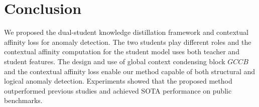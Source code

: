 \documentclass[10pt,twocolumn,letterpaper]{article}
\begin{document}
\section{Conclusion}
We proposed the dual-student knowledge distillation framework and contextual affinity loss for anomaly detection. The two students play different roles and the contextual affinity computation for the student model uses both teacher and student features. The design and use of global context condensing block $GCCB$ and the contextual affinity loss enable our method capable of both structural and logical anomaly detection. Experiments showed that the proposed method outperformed previous studies and achieved SOTA performance on public benchmarks.


{\small


}
\end{document}
